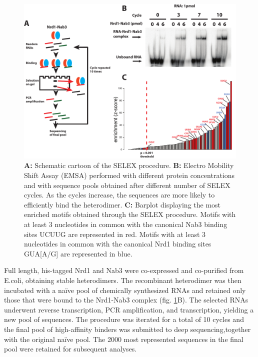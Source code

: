 \begin{figure}[h]

\centering
\includegraphics[width=\textwidth]{figures/results/selex}
\caption[SELEX procedure]{\textbf{A: }Schematic cartoon of the SELEX procedure. \textbf{B: }Electro Mobility Shift Assay (EMSA) performed with different protein concentrations and with sequence pools obtained after different number of SELEX cycles. As the cycles increase, the sequences are more likely to efficiently bind the heterodimer. \textbf{C: } Barplot displaying the most enriched motifs obtained through the SELEX procedure. Motifs with at least 3 nucleotides in common with the canonical Nab3 binding sites UCUUG are represented in red. Motifs with at least 3 nucleotides in common with the canonical Nrd1 binding sites GUA[A/G] are represented in blue.}
\label{fig:selex}

\end{figure} 

Full length, his-tagged Nrd1 and Nab3 were co-expressed and co-purified from E.coli, obtaining stable heterodimers. The recombinant heterodimer was then incubated with a naïve pool of chemically synthesized RNAs and retained only those that were bound to the Nrd1-Nab3 complex (fig. \ref{fig:selex}B). 
The selected RNAs underwent reverse transcription, PCR amplification, and \invitro{} transcription, yielding a new pool of sequences. The procedure was iterated for a total of 10 cycles and the final pool of high-affinity binders was submitted to deep sequencing,together with the original naïve pool. The 2000 most represented sequences in the final pool were retained for subsequent analyses. 



